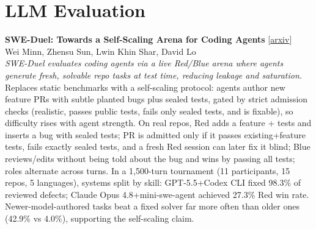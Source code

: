 \documentclass[12pt,letterpaper]{article}
\begin{document}
\medskip


\section*{LLM Evaluation}

{\small\textbf{SWE-Duel: Towards a Self-Scaling Arena for Coding Agents}} {\scriptsize[\href{https://arxiv.org/abs/2610.12569}{arxiv}]}\\
{\scriptsize Wei Minn, Zhensu Sun, Lwin Khin Shar, David Lo}\\

{\small\textit{SWE-Duel evaluates coding agents via a live Red/Blue arena where agents generate fresh, solvable repo tasks at test time, reducing leakage and saturation.}}\\[1pt]
{\footnotesize Replaces static benchmarks with a self-scaling protocol: agents author new feature PRs with subtle planted bugs plus sealed tests, gated by strict admission checks (realistic, passes public tests, fails only sealed tests, and is fixable), so difficulty rises with agent strength. On real repos, Red adds a feature + tests and inserts a bug with sealed tests; PR is admitted only if it passes existing+feature tests, fails exactly sealed tests, and a fresh Red session can later fix it blind; Blue reviews/edits without being told about the bug and wins by passing all tests; roles alternate across turns. In a 1,500-turn tournament (11 participants, 15 repos, 5 languages), systems split by skill: GPT-5.5+Codex CLI fixed 98.3\% of reviewed defects; Claude Opus 4.8+mini-swe-agent achieved 27.3\% Red win rate. Newer-model-authored tasks beat a fixed solver far more often than older ones (42.9\% vs 4.0\%), supporting the self-scaling claim.}

\medskip
\end{document}
